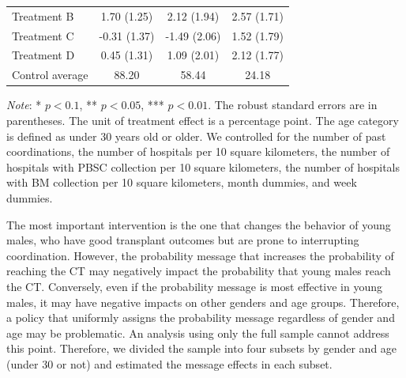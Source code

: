 \documentclass[12pt, a4paper]{article}
\begin{document}
\begin{table}
\begin{threeparttable}
\begin{tabular}[t]{lccc}
\hspace{1em}Treatment B & 1.70 (1.25) & 2.12 (1.94) & 2.57 (1.71)\\
\hspace{1em}Treatment C & -0.31 (1.37) & -1.49 (2.06) & 1.52 (1.79)\\
\hspace{1em}Treatment D & 0.45 (1.31) & 1.09 (2.01) & 2.12 (1.77)\\
\hspace{1em}Control average & 88.20 & 58.44 & 24.18\\
\bottomrule
\end{tabular}
\begin{tablenotes}
\item \emph{Note}: * $p < 0.1$, ** $p < 0.05$, *** $p < 0.01$. The robust standard errors are in parentheses. The unit of treatment effect is a percentage point. The age category is defined as under 30 years old or older. We controlled for the number of past coordinations, the number of hospitals per 10 square kilometers, the number of hospitals with PBSC collection per 10 square kilometers, the number of hospitals with BM collection per 10 square kilometers, month dummies, and week dummies.
\end{tablenotes}
\end{threeparttable}
\end{table}

The most important intervention is the one that changes the behavior of young males, who have good transplant outcomes but are prone to interrupting coordination. However, the probability message that increases the probability of reaching the CT may negatively impact the probability that young males reach the CT. Conversely, even if the probability message is most effective in young males, it may have negative impacts on other genders and age groups. Therefore, a policy that uniformly assigns the probability message regardless of gender and age may be problematic. An analysis using only the full sample cannot address this point. Therefore, we divided the sample into four subsets by gender and age (under 30 or not) and estimated the message effects in each subset.
\end{document}
